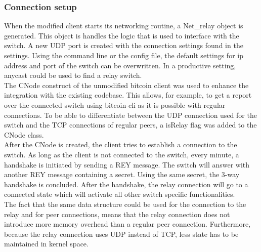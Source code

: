 \subsubsection{Connection setup}
When the modified client starts its networking routine, a Net\_relay object is generated. This object is handles the logic that is used to interface with the switch. A new UDP port is created with the connection settings found in the settings. Using the command line or the config file, the default settings for ip address and port of the switch can be overwritten. In a productive setting, anycast could be used to find a relay switch. \\
The CNode construct of the unmodified bitcoin client was used to enhance the integration with the existing codebase. This allows, for example, to get a report over the connected switch using bitcoin-cli as it is possible with regular connections. To be able to differentiate between the UDP connection used for the switch and the TCP connections of regular peers, a isRelay flag was added to the CNode class.\\
After the CNode is created, the client tries to establish a connection to the switch. As long as the client is not connected to the switch, every minute, a handshake is initiated by sending a REY message. The switch will answer with another REY message containing a secret. Using the same secret, the 3-way handshake is concluded. After the handshake, the relay connection will go to a connected state which will activate all other switch specific functionalities.\\
The fact that the same data structure could be used for the connection to the relay and for peer connections, means that the relay connection does not introduce more memory overhead than a regular peer connection. Furthermore, because the relay connection uses UDP instead of TCP, less state has to be maintained in kernel space. 


